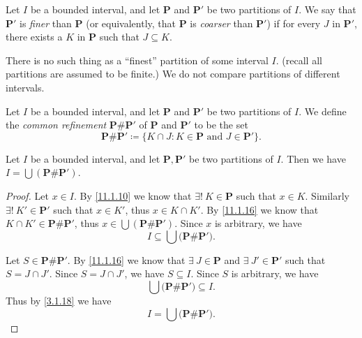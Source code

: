 \begin{definition}\label{11.1.14}
  Let \(I\) be a bounded interval, and let \(\mathbf{P}\) and \(\mathbf{P}'\) be two partitions of \(I\).
  We say that \(\mathbf{P}'\) is \emph{finer} than \(\mathbf{P}\) (or equivalently, that \(\mathbf{P}\) is \emph{coarser} than \(\mathbf{P}'\)) if for every \(J\) in \(\mathbf{P}'\), there exists a \(K\) in \(\mathbf{P}\) such that \(J \subseteq K\).
\end{definition}

\begin{note}
  There is no such thing as a ``finest'' partition of some interval \(I\).
  (recall all partitions are assumed to be finite.)
  We do not compare partitions of different intervals.
\end{note}

\setcounter{theorem}{15}
\begin{definition}\label{11.1.16}
  Let \(I\) be a bounded interval, and let \(\mathbf{P}\) and \(\mathbf{P}'\) be two partitions of \(I\).
  We define the \emph{common refinement} \(\mathbf{P} \# \mathbf{P}'\) of \(\mathbf{P}\) and \(\mathbf{P}'\) to be the set
  \[
    \mathbf{P} \# \mathbf{P}' \coloneqq \{K \cap J : K \in \mathbf{P} \text{ and } J \in \mathbf{P}'\}.
  \]
\end{definition}

\begin{additional corollary}\label{ac 11.1.1}
Let \(I\) be a bounded interval, and let \(\mathbf{P}, \mathbf{P}'\) be two partitions of \(I\).
Then we have \(I = \bigcup (\mathbf{P} \# \mathbf{P}')\).
\end{additional corollary}

\begin{proof}
  Let \(x \in I\).
  By \cref{11.1.10} we know that \(\exists!\ K \in \mathbf{P}\) such that \(x \in K\).
  Similarly \(\exists!\ K' \in \mathbf{P}'\) such that \(x \in K'\), thus \(x \in K \cap K'\).
  By \cref{11.1.16} we know that \(K \cap K' \in \mathbf{P} \# \mathbf{P}'\), thus \(x \in \bigcup (\mathbf{P} \# \mathbf{P}')\).
  Since \(x\) is arbitrary, we have
  \[
    I \subseteq \bigcup \big(\mathbf{P} \# \mathbf{P}'\big).
  \]

  Let \(S \in \mathbf{P} \# \mathbf{P}'\).
  By \cref{11.1.16} we know that \(\exists\ J \in \mathbf{P}\) and \(\exists\ J' \in \mathbf{P}'\) such that \(S = J \cap J'\).
  Since \(S = J \cap J'\), we have \(S \subseteq I\).
  Since \(S\) is arbitrary, we have
  \[
    \bigcup \big(\mathbf{P} \# \mathbf{P}'\big) \subseteq I.
  \]
  Thus by \cref{3.1.18} we have
  \[
    I = \bigcup \big(\mathbf{P} \# \mathbf{P}'\big).
  \]
\end{proof}

